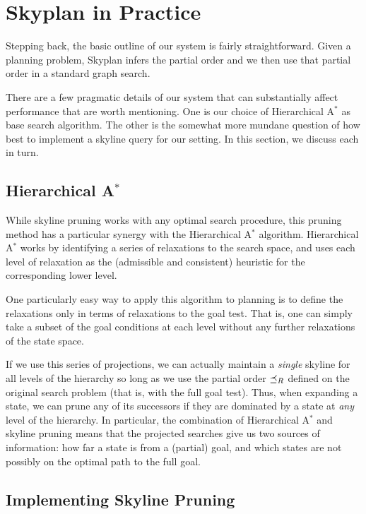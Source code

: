 \documentclass[letterpaper]{article}
\theoremstyle{plain} \newtheorem{theorem}{Theorem} \newtheorem{proposition}{Proposition} \newtheorem{lemma}{Lemma}
\theoremstyle{definition} \newtheorem{definition}{Definition} \newtheorem{conjecture}{Conjecture} \newtheorem*{example}{Example}
\theoremstyle{remark} \newtheorem*{remark}{Remark} \newtheorem*{note}{Note} \newtheorem{case}{Case}
\newcommand{\Astar}{A$^*$ }
\begin{document}
\section{Skyplan in Practice}

Stepping back, the basic outline of our system is fairly straightforward.
Given a planning problem, Skyplan infers the partial order
and we then use that partial order in a standard graph search.

There are a few pragmatic details of our system that can substantially
affect performance that are worth mentioning. One is our choice of
Hierarchical \Astar\citep{holte1996hierarchical} as base search
algorithm. The
other is the somewhat more mundane question of how best to implement
a skyline query for our setting.  In this section, we discuss each
in turn.

\subsection{Hierarchical \Astar}
While skyline pruning works with any optimal search procedure, this
pruning method has a particular synergy with the Hierarchical \Astar
algorithm. Hierarchical \Astar works
by identifying a series of relaxations to the search space, and
uses each level of relaxation as the (admissible and consistent)
heuristic for the corresponding lower level.

One particularly easy way to apply this algorithm to planning is
to define the relaxations only in terms of relaxations to the goal
test. That is, one can simply take a subset of the goal conditions
at each level without any further relaxations of the state space. 

If we use this series of projections, we can actually maintain a
\textit{single} skyline for all levels of the hierarchy so long as
we use the partial order $\preceq_R$ defined on the original search problem
(that is, with the full goal test). Thus, when expanding a 
state, we can prune any of its successors if they are dominated
by a state at \textit{any} level of the hierarchy.  In particular,
the combination of Hierarchical \Astar and skyline pruning means
that the projected searches give us two sources of information: how
far a state is from a (partial) goal, and which states are not
possibly on the optimal path to the full goal. 

\subsection{Implementing Skyline Pruning}
\end{document}
